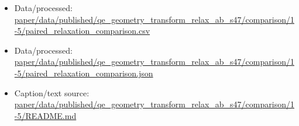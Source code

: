\begin{itemize}[leftmargin=1.4em,noitemsep]
\item Data/processed: \begingroup\scriptsize\url{paper/data/published/qe_geometry_transform_relax_ab_s47/comparison/1-5/paired_relaxation_comparison.csv}\endgroup
\item Data/processed: \begingroup\scriptsize\url{paper/data/published/qe_geometry_transform_relax_ab_s47/comparison/1-5/paired_relaxation_comparison.json}\endgroup
\item Caption/text source: \begingroup\scriptsize\url{paper/data/published/qe_geometry_transform_relax_ab_s47/comparison/1-5/README.md}\endgroup
\end{itemize}
